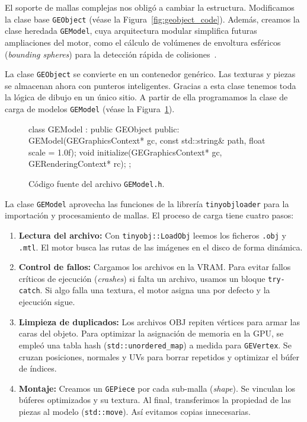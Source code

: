 El soporte de mallas complejas nos obligó a cambiar la estructura. Modificamos la clase base \texttt{GEObject} (véase la Figura~\ref{fig:geobject_code}).
Además, creamos la clase heredada \texttt{GEModel}, cuya arquitectura modular simplifica futuras ampliaciones del motor,
 como el cálculo de volúmenes de envoltura esféricos (\textit{bounding spheres}) para la detección rápida de colisiones~\parencite{ericson2004real}.

La clase \texttt{GEObject} se convierte en un contenedor genérico. Las texturas y piezas se almacenan ahora con punteros inteligentes. 
Gracias a esta clase tenemos toda la lógica de dibujo en un único sitio. A partir de ella programamos la clase de carga de modelos \texttt{GEModel} (véase la Figura~\ref{fig:gemodel_code}).

\begin{figure}[!htbp]
    \centering
\begin{carbonbox}
class GEModel : public GEObject {
public:
    GEModel(GEGraphicsContext* gc, const std::string& path, float scale = 1.0f);
    void initialize(GEGraphicsContext* gc, GERenderingContext* rc); 
};
\end{carbonbox}
    \caption{Código fuente del archivo \texttt{GEModel.h}.}
    \label{fig:gemodel_code}
\end{figure}

La clase \texttt{GEModel} aprovecha las funciones de la librería \texttt{tinyobjloader} para la importación y procesamiento de mallas.                                               
El proceso de carga tiene cuatro pasos:
\begin{enumerate}
    \item \textbf{Lectura del archivo:} Con \texttt{tinyobj::LoadObj} leemos los ficheros \texttt{.obj} y \texttt{.mtl}. El motor busca las rutas de las imágenes en el disco de forma dinámica.
    \vspace{\baselineskip}
    \item \textbf{Control de fallos:} Cargamos los archivos en la VRAM. Para evitar fallos críticos de ejecución (\textit{crashes}) si falta un archivo, usamos un bloque \texttt{try-catch}. Si algo falla una textura, el motor asigna una por defecto y la ejecución sigue.
    \item \textbf{Limpieza de duplicados:} Los archivos OBJ repiten vértices para armar las caras del objeto. Para optimizar la asignación de memoria en la GPU, se empleó una tabla hash (\texttt{std::unordered\_map}) a medida para \texttt{GEVertex}. Se cruzan posiciones, normales y UVs para borrar repetidos y optimizar el búfer de índices.
    \item \textbf{Montaje:} Creamos un \texttt{GEPiece} por cada sub-malla (\textit{shape}). Se vinculan los búferes optimizados y su textura. Al final, transferimos la propiedad de las piezas al modelo (\texttt{std::move}). Así evitamos copias innecesarias.
\end{enumerate}

